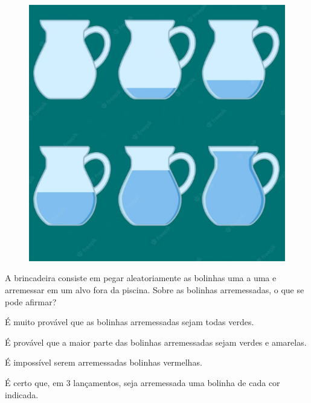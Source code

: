 \begin{figure}[htpb!]
\includegraphics[width=\textwidth]{./media/image147.png}
\end{figure}

A brincadeira consiste em pegar aleatoriamente as bolinhas uma a uma e
arremessar em um alvo fora da piscina. Sobre as bolinhas arremessadas, o que se pode afirmar?

\begin{escolha}
\item É muito provável que as bolinhas arremessadas sejam todas verdes.

\item É provável que a maior parte das bolinhas arremessadas sejam verdes e amarelas.

\item É impossível serem arremessadas bolinhas vermelhas.

\item É certo que, em 3 lançamentos, seja arremessada uma bolinha de cada cor indicada.
\end{escolha}


